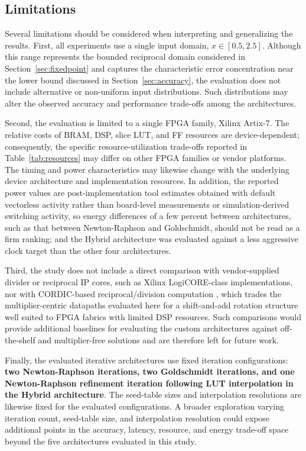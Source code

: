 \documentclass[manuscript,screen,review]{acmart}
\begin{document}
\subsection{Limitations}

Several limitations should be considered when interpreting and generalizing the results. First, all experiments use a single input domain, $x \in [0.5, 2.5]$. Although this range represents the bounded reciprocal domain considered in Section~\ref{sec:fixedpoint} and captures the characteristic error concentration near the lower bound discussed in Section~\ref{sec:accuracy}, the evaluation does not include alternative or non-uniform input distributions. Such distributions may alter the observed accuracy and performance trade-offs among the architectures.

Second, the evaluation is limited to a single FPGA family, Xilinx Artix-7. The relative costs of BRAM, DSP, slice LUT, and FF resources are device-dependent; consequently, the specific resource-utilization trade-offs reported in Table~\ref{tab:resources} may differ on other FPGA families or vendor platforms. The timing and power characteristics may likewise change with the underlying device architecture and implementation resources. In addition, the reported power values are post-implementation tool estimates obtained with default vectorless activity rather than board-level measurements or simulation-derived switching activity, so energy differences of a few percent between architectures, such as that between Newton-Raphson and Goldschmidt, should not be read as a firm ranking; and the Hybrid architecture was evaluated against a less aggressive clock target than the other four architectures.

Third, the study does not include a direct comparison with vendor-supplied divider or reciprocal IP cores, such as Xilinx LogiCORE-class implementations, nor with CORDIC-based reciprocal/division computation \cite{Volder59,Andraka98}, which trades the multiplier-centric datapaths evaluated here for a shift-and-add rotation structure well suited to FPGA fabrics with limited DSP resources. Such comparisons would provide additional baselines for evaluating the custom architectures against off-the-shelf and multiplier-free solutions and are therefore left for future work.

Finally, the evaluated iterative architectures use fixed iteration configurations: \textbf{two Newton-Raphson iterations, two Goldschmidt iterations, and one Newton-Raphson refinement iteration following LUT interpolation in the Hybrid architecture}. The seed-table sizes and interpolation resolutions are likewise fixed for the evaluated configurations. A broader exploration varying iteration count, seed-table size, and interpolation resolution could expose additional points in the accuracy, latency, resource, and energy trade-off space beyond the five architectures evaluated in this study.
\end{document}
